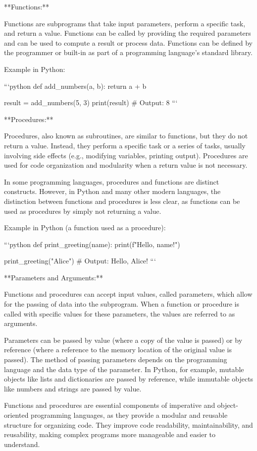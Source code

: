 \documentclass{article}
\begin{document}
**Functions:**

Functions are subprograms that take input parameters, perform a specific task, and return a value. Functions can be called by providing the required parameters and can be used to compute a result or process data. Functions can be defined by the programmer or built-in as part of a programming language's standard library.

Example in Python:

```python
def add_numbers(a, b):
    return a + b

result = add_numbers(5, 3)
print(result)  # Output: 8
```

**Procedures:**

Procedures, also known as subroutines, are similar to functions, but they do not return a value. Instead, they perform a specific task or a series of tasks, usually involving side effects (e.g., modifying variables, printing output). Procedures are used for code organization and modularity when a return value is not necessary.

In some programming languages, procedures and functions are distinct constructs. However, in Python and many other modern languages, the distinction between functions and procedures is less clear, as functions can be used as procedures by simply not returning a value.

Example in Python (a function used as a procedure):

```python
def print_greeting(name):
    print(f"Hello, {name}!")

print_greeting("Alice")  # Output: Hello, Alice!
```

**Parameters and Arguments:**

Functions and procedures can accept input values, called parameters, which allow for the passing of data into the subprogram. When a function or procedure is called with specific values for these parameters, the values are referred to as arguments.

Parameters can be passed by value (where a copy of the value is passed) or by reference (where a reference to the memory location of the original value is passed). The method of passing parameters depends on the programming language and the data type of the parameter. In Python, for example, mutable objects like lists and dictionaries are passed by reference, while immutable objects like numbers and strings are passed by value.

Functions and procedures are essential components of imperative and object-oriented programming languages, as they provide a modular and reusable structure for organizing code. They improve code readability, maintainability, and reusability, making complex programs more manageable and easier to understand.
\end{document}
